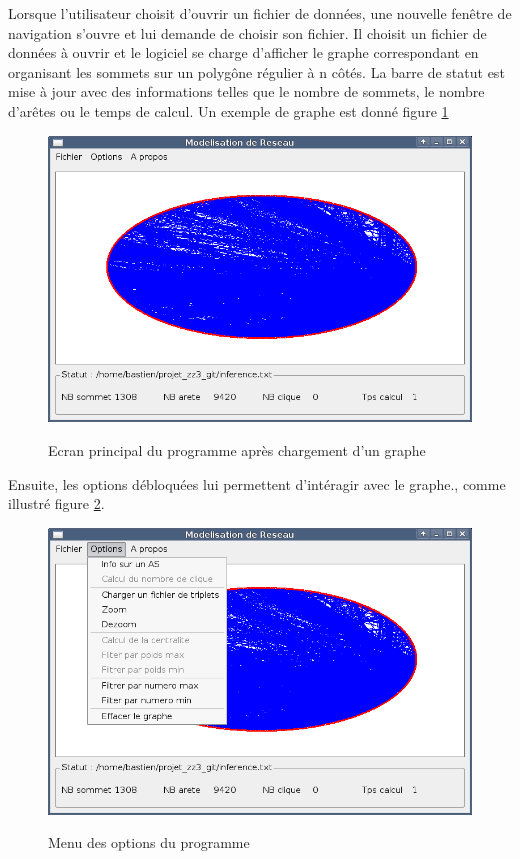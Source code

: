 Lorsque l'utilisateur choisit d'ouvrir un fichier de donn\'ees, une nouvelle fen\^etre de navigation s'ouvre et lui demande de choisir son fichier. Il choisit un fichier de donn\'ees \`a ouvrir et le logiciel se charge d'afficher le graphe correspondant en organisant les sommets sur un polyg\^one r\'egulier \`a n c\^ot\'es.
La barre de statut est mise \`a jour avec des informations telles que le nombre de sommets, le nombre d'ar\^etes ou le temps de calcul. Un exemple de graphe est donn\'e figure \ref{ecran_graph}

\begin{figure}[H]
\centering
 \fbox
 {
 \includegraphics[width=16cm]{./schema/capture_ecran_graph.png}
 }
  \caption{\label{ecran_graph}Ecran principal du programme apr\`es chargement d'un graphe}
\end{figure}

\par
Ensuite, les options d\'ebloqu\'ees lui permettent d'int\'eragir avec le graphe., comme illustr\'e figure \ref{ecran_option}.

\begin{figure}[H]
\centering
 \fbox
 {
 \includegraphics[width=16cm]{./schema/capture_ecran_options.png}
 }
  \caption{\label{ecran_option}Menu des options du programme}
\end{figure}

